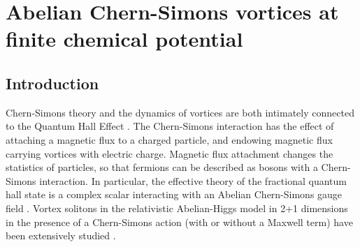 \chapter{Abelian Chern-Simons vortices at finite chemical potential}
\label{ch:Chapter_2}
    \graphicspath{{Chapter_2_Folder/figures/PNG/}{Chapter_2_Folder/figures/PDF/}{Chapter_2_Folder/figures/}}


\section{Introduction}
Chern-Simons theory and the dynamics of vortices are both intimately connected to the Quantum Hall Effect \cite{PhysRevLett.62.82}. The Chern-Simons interaction  has the effect of attaching a magnetic flux to a charged particle, and endowing magnetic flux carrying vortices  with electric charge.  Magnetic flux attachment changes the  statistics of particles, so that fermions can be described as bosons with a Chern-Simons interaction. In particular, the effective theory of the fractional quantum hall state is a complex scalar interacting with an Abelian Chern-Simons gauge field \cite{PhysRevLett.62.82, Tong:2016kpv}.
Vortex solitons in the relativistic Abelian-Higgs model  in 2+1 dimensions in the presence  of a Chern-Simons action  (with or without a Maxwell term) have been extensively studied \cite{Paul1986, Jackiw1990a, Hong1990, Jackiw1990b, Dunne:1998qy, Horvathy:2008hd}.

